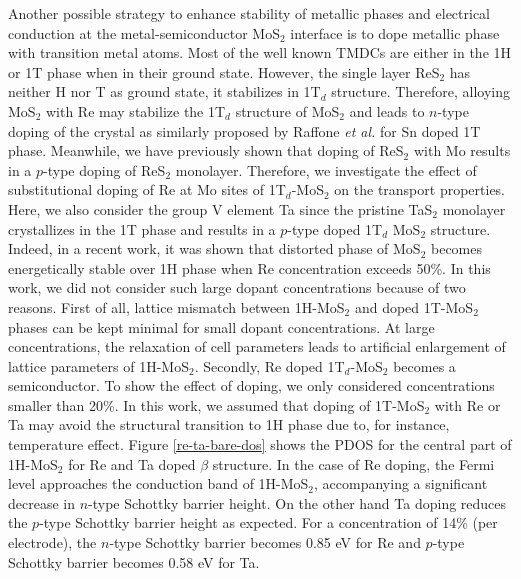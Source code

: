 Another possible strategy to enhance stability of metallic phases and electrical conduction at the metal-semiconductor MoS$_2$ interface is to dope metallic phase with transition metal atoms. Most of the well known TMDCs are either in the 1H or 1T phase when in their ground state. However, the single layer ReS$_2$ has neither H nor T as ground state, it stabilizes in 1T$_d$ structure\cite{tongay-res2,res2-cakir}. Therefore, alloying MoS$_2$ with Re may stabilize the 1T$_d$ structure of MoS$_{2}$ and leads to $n$-type doping of the crystal as similarly proposed by Raffone \textit{et al.} for Sn doped 1T phase\cite{Raffone}.  Meanwhile, we have previously shown that doping of ReS$_2$ with Mo results in a $p$-type doping of ReS$_2$ monolayer\cite{res2-cakir}. Therefore, we investigate the effect of substitutional doping of Re at Mo sites of 1T$_d$-MoS$_2$ on the transport properties. Here, we also consider the group V element Ta since the pristine TaS$_2$ monolayer crystallizes in the 1T phase and results in  a $p$-type doped 1T$_d$ MoS$_{2}$ structure. Indeed, in a recent work, it was shown that distorted phase of MoS$_2$ becomes energetically stable over 1H phase when Re concentration exceeds 50\%\cite{doi:10.1021/acs.jpcc.5b10739}. In this work, we did not consider such large dopant concentrations because of two reasons. First of all, lattice mismatch between 1H-MoS$_2$ and doped 1T-MoS$_2$ phases can be kept minimal for small dopant concentrations. At large concentrations, the relaxation of cell parameters leads to artificial enlargement of lattice parameters of  1H-MoS$_2$.  Secondly, Re doped 1T$_d$-MoS$_2$ becomes a semiconductor. To show the effect of doping, we only considered concentrations smaller than 20\%.  In this work, we assumed that doping of 1T-MoS$_2$ with Re or Ta may avoid the structural transition to 1H phase due to, for instance, temperature effect.  Figure \ref{re-ta-bare-dos} shows the PDOS for the central part of 1H-MoS$_2$ for Re and Ta doped $\beta$ structure. In the case of Re doping, the Fermi level approaches the conduction band of 1H-MoS$_2$, accompanying a significant decrease in $n$-type Schottky barrier height. On the other hand Ta doping reduces the $p$-type Schottky barrier height as expected. For a concentration of 14\% (per electrode), the $n$-type Schottky barrier becomes 0.85 eV for Re and $p$-type Schottky barrier becomes 0.58 eV for Ta.

